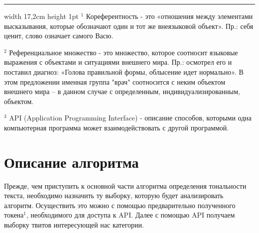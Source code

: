 \documentclass[14pt,a4paper]{scrartcl}
\begin{document}
\medskip
\hrule width 17,2cm height 1pt
\medskip$^1$ Кореферентность - это «отношения между элементами высказывания, которые обозначают один и тот же внеязыковой объект». Пр.: { себя ценит}, слово {} означает самого Васю.

$^2$ Референциальное множество - это множество, которое соотносит языковые выражения с объектами и ситуациями внешнего мира. Пр.: { осмотрел его и поставил диагноз: «Голова правильной формы, облысение идет нормально».} В этом предложении именная группа "врач" соотносится с неким объектом внешнего мира – в данном случае с определенным, индивидуализированным, объектом.

$^3$ API (Application Programming Interface) - описание способов, которыми одна компьютерная программа может взаимодействовать с другой программой.
\newpage
\section{Описание алгоритма}

Прежде, чем приступить к основной части алгоритма определения тональности текста, необходимо назначить ту выборку, которую будет анализировать алгоритм. Осуществить это можно с помощью предварительно полученного токена$^1$, необходимого для доступа к API. Далее с помощью API получаем выборку твитов интересующей нас категории. 
\end{document}
